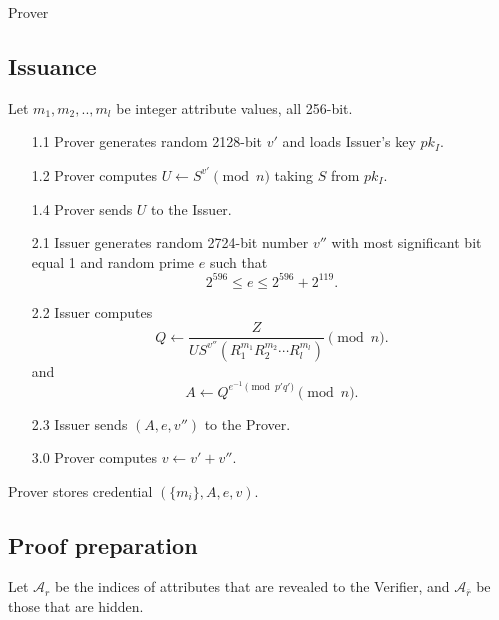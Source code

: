 \documentclass[a4paper]{article}
\begin{document}
Prover 


\subsection{Issuance}
Let $m_1,m_2,..,m_l$ be integer attribute values, all 256-bit. 
\begin{enumerate}
\item [1.1] Prover generates random 2128-bit $v'$ and loads Issuer's key $pk_I$.
\item [1.2] Prover computes $
U \leftarrow S^{v'}\pmod{n}$ taking $S$ from $pk_I$.
\item [1.4] Prover sends $U$ to the Issuer.
\item [2.1] Issuer generates  random 2724-bit number $v''$ with most significant bit equal 1 and random prime  $e$ such that
$$
2^{596}\leq e \leq 2^{596}+ 2^{119}.
$$
\item [2.2] Issuer computes 
$$
Q \leftarrow \frac{Z}{U S^{v''}(R_1^{m_1}R_2^{m_2}\cdots  R_l^{m_l})}\pmod{n}.
$$
and
$$
A \leftarrow Q^{e^{-1}\pmod{p'q'}}\pmod{n}.
$$
\item [2.3] Issuer sends $(A,e,v'')$ to the Prover.
\item [3.0] Prover computes $v \leftarrow v'+v''$.
\end{enumerate}
Prover stores credential $(\{m_i\},A,e,v)$.

\subsection{Proof preparation}
Let $\mathcal{A}_r$ be the indices of attributes  that are revealed to the Verifier, and $\mathcal{A}_{\overline{r}}$ be those that are hidden.
\end{document}
